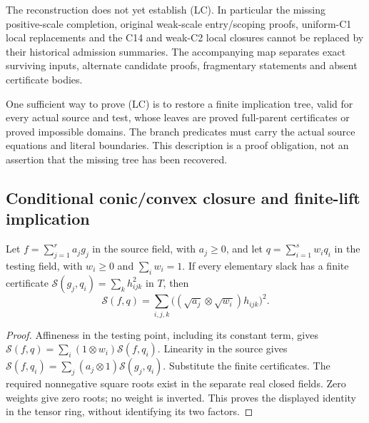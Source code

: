 The reconstruction does not yet establish (LC). In particular the
missing positive-scale completion, original weak-scale entry/scoping
proofs, uniform-C1 local replacements and the C14 and weak-C2 local
closures cannot be replaced by their historical admission summaries.
The accompanying map separates exact surviving inputs, alternate
candidate proofs, fragmentary statements and absent certificate bodies.

One sufficient way to prove (LC) is to restore a finite implication
tree, valid for every actual source and test, whose leaves are
proved full-parent certificates or proved impossible domains.
The branch predicates must carry the actual source equations and
literal boundaries. This description is a proof obligation, not an
assertion that the missing tree has been recovered.

\subsection{Conditional conic/convex closure and finite-lift implication}

\begin{lemma}
Let $f=\sum_{j=1}^r a_jg_j$ in the source field, with $a_j\geq0$,
and let $q=\sum_{i=1}^s w_iq_i$ in the testing field, with
$w_i\geq0$ and $\sum_iw_i=1$. If every elementary slack has a
finite certificate
$\mathscr S(g_j,q_i)=\sum_kh_{ijk}^2$ in $T$, then
\[
 \mathscr S(f,q)=
 \sum_{i,j,k}\bigl((\sqrt{a_j}\otimes\sqrt{w_i})h_{ijk}\bigr)^2.
 \tag{RFA16}
\]
\end{lemma}
\begin{proof}
Affineness in the testing point, including its constant term, gives
$\mathscr S(f,q)=\sum_i(1\otimes w_i)\mathscr S(f,q_i)$.
Linearity in the source gives
$\mathscr S(f,q_i)=\sum_j(a_j\otimes1)\mathscr S(g_j,q_i)$.
Substitute the finite certificates. The required nonnegative square
roots exist in the separate real closed fields. Zero weights give
zero roots; no weight is inverted. This proves the displayed identity
in the tensor ring, without identifying its two factors.
\end{proof}

